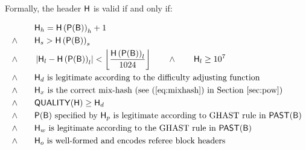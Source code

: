 \medskip

Formally, the header $\textsf{H}$ is valid if and only if: 


\begin{align}
	&{\textsf{H}_h} = \textsf{H}\left(\mathsf{P}(\textsf{B})\right)_{h}+1\\
	\land \qquad &{\textsf{H}_s} > \textsf{H}\left(\mathsf{P}(\textsf{B})\right)_{s}\\
	\land \qquad & \left|{\textsf{H}_l} -\textsf{H}\left(\mathsf{P}(\textsf{B})\right)_{l}\right|< \left\lfloor\frac{\textsf{H}\left(\mathsf{P}(\textsf{B})\right)_{l}}{1024}\right\rfloor \qquad
	\land \qquad {\textsf{H}_l}\ge 10^7 \label{eq:blockgas}\\
	\land \qquad & \text{${\textsf{H}_d}$ is legitimate according to the difficulty adjusting function}\\
	\land \qquad & \text{${\textsf{H}_x}$ is the correct mix-hash (see (\ref{eq:mixhash}) in Section~\ref{sec:pow})}\\
	\land \qquad & \mathsf{QUALITY}(\textsf{H}) \ge {\textsf{H}_d}\\
	\land \qquad & {\text{$\mathsf{P}(\textsf{B})$ specified by ${\textsf{H}_p}$ is legitimate according to GHAST rule in $\mathsf{PAST}(\textsf{B})$}}\\
	\land \qquad & {\text{${\textsf{H}_w}$ is legitimate according to the GHAST rule in $\mathsf{PAST}(\textsf{B})$}}\\
	\land \qquad & {\text{${\textsf{H}_o}$ is well-formed and encodes referee block headers}}
\end{align}



